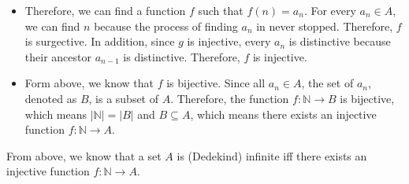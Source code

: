 \documentclass{article}[12pt]
\begin{document}
\begin{enumerate}
\begin{itemize}
\item Therefore, we can find a function $f$ such that $f(n)=a_n$. For every $a_n\in A$, we can find $n$ because the process of finding $a_n$ in never stopped. Therefore, $f$ is surgective. In addition, since $g$ is injective, every $a_n$ is distinctive because their ancestor $a_{n-1}$ is distinctive. Therefore, $f$ is injective. 
\item Form above, we know that $f$ is bijective. Since all $a_n\in A$, the set of $a_n$, denoted as $B$, is a subset of $A$. Therefore, the function $f:\mathbb{N}\rightarrow B$ is bijective, which means $|\mathbb{N}|=|B|$ and $B\subseteq A$, which means there exists an injective function $f:\mathbb{N}\rightarrow A$.
\end{itemize}
\end{enumerate}
From above, we know that a set $A$ is (Dedekind) infinite iff there exists an injective function $f:\mathbb{N}\rightarrow A$.\\
\end{document}
